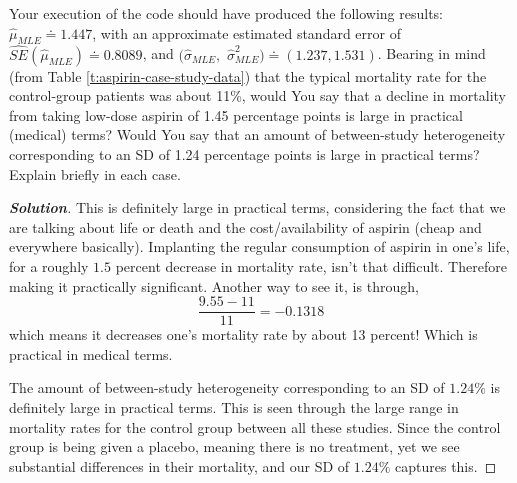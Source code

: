 \documentclass[12pt]{article}
\newenvironment{solution}{\begin{tcolorbox}[breakable]\begin{proof}[\textbf{\textit{Solution}}] }{\end{proof}\end{tcolorbox}}
\begin{document}
\begin{itemize}
\begin{itemize}
Your execution of the code should have produced the following results: $\hat{ \mu }_{ MLE } \doteq 1.447$, with an approximate estimated standard error of $\widehat{ SE } \left( \hat{ \mu }_{ MLE } \right) \doteq 0.8089$, and $( \hat{ \sigma }_{ MLE },$ $\hat{ \sigma }_{ MLE }^2 ) \doteq ( 1.237, 1.531 )$. Bearing in mind (from Table \ref{t:aspirin-case-study-data}) that the typical mortality rate for the control-group patients was about 11\%, would You say that a decline in mortality from taking low-dose aspirin of 1.45 percentage points is large in practical (medical) terms? Would You say that an amount of between-study heterogeneity corresponding to an SD of 1.24 percentage points is large in practical terms? Explain briefly in each case. \textit{\fbox{\textbf{[5 points]}}}
\begin{solution}
    This is definitely large in practical terms, considering the fact that we are talking about life or death and the cost/availability of aspirin (cheap and everywhere basically). Implanting the regular consumption of aspirin in one's life, for a roughly $1.5$ percent decrease in mortality rate, isn't that difficult. Therefore making it practically significant. Another way to see it, is through,
    \[\dfrac{9.55 - 11}{11} = -0.1318 \]
    which means it decreases one's mortality rate by about 13 percent! Which is practical in medical terms. 

    The amount of between-study heterogeneity corresponding to an SD of $1.24\%$ is definitely large in practical terms. This is seen through the large range in mortality rates for the control group between all these studies. Since the control group is being given a placebo, meaning there is no treatment, yet we see substantial differences in their mortality, and our SD of $1.24\%$ captures this. 
\end{solution}
\end{itemize}

\end{itemize}
\end{document}
